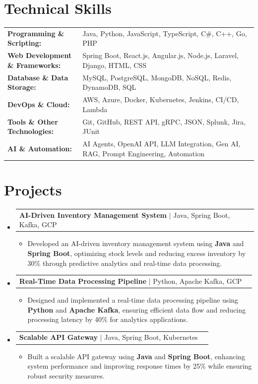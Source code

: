 \documentclass[letterpaper,10pt]{article}
\makeatletter
\newcommand{\resumeItem}[1]{
  \item{\fontsize{8pt}{9pt}\selectfont
    #1 \vspace{-3pt}
  }
}
\newcommand{\resumeProjectHeading}[2]{
    \item
    \begin{tabular*}{1.001\textwidth}{l@{\extracolsep{\fill}}r}
      \fontsize{8.5pt}{10pt}#1 & \textbf{\fontsize{8.5pt}{10pt} #2}\\
    \end{tabular*}\vspace{-7pt}
}
\newcommand{\resumeSubHeadingListStart}{\begin{itemize}[leftmargin=0pt, label={}]}
\newcommand{\resumeSubHeadingListEnd}{\end{itemize}}
\newcommand{\resumeItemListStart}{\begin{itemize}[leftmargin=*]}
\newcommand{\resumeItemListEnd}{\end{itemize}\vspace{-5pt}}
\makeatother
\begin{document}
\section{Technical Skills}
        \vspace{-14pt}
        \begin{table}[h]
            \fontsize{8pt}{9pt}\selectfont
            \begin{tabular}{p{0.3\linewidth} p{0.7\linewidth}}
                \textbf{Programming \& Scripting:} & Java, Python, JavaScript, TypeScript, C\#, C++, Go, PHP \\
                \textbf{Web Development \& Frameworks:} & Spring Boot, React.js, Angular.js, Node.js, Laravel, Django, HTML, CSS \\
                \textbf{Database \& Data Storage:} & MySQL, PostgreSQL, MongoDB, NoSQL, Redis, DynamoDB, SQL \\
                \textbf{DevOps \& Cloud:} & AWS, Azure, Docker, Kubernetes, Jenkins, CI/CD, Lambda \\
                \textbf{Tools \& Other Technologies:} & Git, GitHub, REST API, gRPC, JSON, Splunk, Jira, JUnit \\
                \textbf{AI \& Automation:} & AI Agents, OpenAI API, LLM Integration, Gen AI, RAG, Prompt Engineering, Automation \\
            \end{tabular}
        \end{table}
 \vspace{-18pt}

\section{Projects}
    \vspace{-5pt}
    \resumeSubHeadingListStart
          \resumeProjectHeading
            {\textbf{AI-Driven Inventory Management System} $|$ Java, Spring Boot, Kafka, GCP}{}
            \resumeItemListStart
                \resumeItem{Developed an AI-driven inventory management system using \textbf{Java} and \textbf{Spring Boot}, optimizing stock levels and reducing excess inventory by 30\% through predictive analytics and real-time data processing.}
            \resumeItemListEnd
        \vspace{-12pt}
    
        \resumeProjectHeading
            {\textbf{Real-Time Data Processing Pipeline} $|$ Python, Apache Kafka, GCP}{}
        \resumeItemListStart
                \resumeItem{Designed and implemented a real-time data processing pipeline using \textbf{Python} and \textbf{Apache Kafka}, ensuring efficient data flow and reducing processing latency by 40\% for analytics applications.}
        \resumeItemListEnd
      \vspace{-12pt}
      \resumeProjectHeading
        {\textbf{Scalable API Gateway} $|$ Java, Spring Boot, Kubernetes}{}
    \resumeItemListStart
            \resumeItem{Built a scalable API gateway using \textbf{Java} and \textbf{Spring Boot}, enhancing system performance and improving response times by 25\% while ensuring robust security measures.}
    \resumeItemListEnd
    \resumeSubHeadingListEnd
\end{document}
